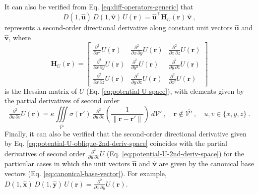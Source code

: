 It can also be verified from Eq. \ref{eq:diff-operators-generic} that 
\begin{equation}
	D(1, \hat{\mathbf{u}}) \, D(1, \hat{\mathbf{v}}) \, U(\mathbf{r}) = 
	\hat{\mathbf{u}}^{\top} \mathbf{H}_{U}(\mathbf{r}) \, \hat{\mathbf{v}} \: ,
	\label{eq:potential-U-oblique-2nd-deriv-space}
\end{equation}
represents a second-order directional derivative along constant unit vectors $\hat{\mathbf{u}}$ and
$\hat{\mathbf{v}}$, where 
\begin{equation}
	\mathbf{H}_{U}(\mathbf{r}) = 
	\begin{bmatrix}
		\tfrac{\partial^{2}}{\partial x^{2}} U(\mathbf{r}) & 
		\tfrac{\partial^{2}}{\partial x \, \partial y} U(\mathbf{r}) & 
		\tfrac{\partial^{2}}{\partial x \, \partial z} U(\mathbf{r}) \\
		\tfrac{\partial^{2}}{\partial x \, \partial y} U(\mathbf{r}) & 
		\tfrac{\partial^{2}}{\partial y^{2}} U(\mathbf{r}) & 
		\tfrac{\partial^{2}}{\partial y \, \partial z} U(\mathbf{r}) \\
		\tfrac{\partial^{2}}{\partial x \, \partial z} U(\mathbf{r}) & 
		\tfrac{\partial^{2}}{\partial y \, \partial z} U(\mathbf{r}) & 
		\tfrac{\partial^{2}}{\partial z^{2}} U(\mathbf{r})
	\end{bmatrix}
	\label{eq:potential-U-Hessian}
\end{equation}
is the Hessian matrix \citep[e.g.,][p. 158]{kaplan2002} of $U$ (Eq. \ref{eq:potential-U-space}),
with elements given by the partial derivatives of second order
\begin{equation}
	\tfrac{\partial^{2}}{\partial u \, \partial v} U(\mathbf{r}) = \kappa \iiint\limits_{\overline{\mathcal{V}'}}
	\sigma(\mathbf{r}') \: 
	\tfrac{\partial^{2}}{\partial u \, \partial v} \left( \frac{1}{\| \mathbf{r} - \mathbf{r}'\|} \right)
	\: d\mathcal{V}' \: , \quad \mathbf{r} \notin \overline{\mathcal{V}'} \: , \quad u, v \in \{ x, y, z \} \: .
	\label{eq:potential-U-2nd-deriv-space}
\end{equation} 
Finally, it can also be verified that the second-order directional derivative given by Eq. 
\ref{eq:potential-U-oblique-2nd-deriv-space} coincides with the partial derivatives of second order 
$\tfrac{\partial^{2}}{\partial u \, \partial v} U$ (Eq. \ref{eq:potential-U-2nd-deriv-space}) for the particular 
cases in which the unit vectors $\hat{\mathbf{u}}$ and $\hat{\mathbf{v}}$ are given by the canonical base vectors 
(Eq. \ref{eq:canonical-base-vector}). For example,
$D(1, \hat{\mathbf{x}}) \, D(1, \hat{\mathbf{y}}) \, U(\mathbf{r}) = \tfrac{\partial^{2}}{\partial x \, \partial y} U(\mathbf{r})$.


